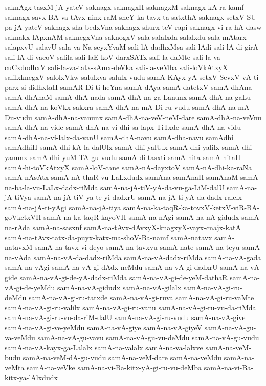 {saknAgx-tasxM-jA-yateV
saknagx
saknagxH
saknagxM
saknagx-kA-ra-kamf
saknagx-savx-BA-va-tAvx-ninx-raM-sheY-ka-tavx-ta-satxthA
saknagx-setxV-SU-pa-jA-yateV
saknagx-sha-bedxVna
saknagx-shurx-teV-rapi
saknagx-vi-ra-hA-dasw
saknakx-lApxnAM
saknegxVna
saknogxV
sala
salalxda
salalxdu
sala-mAtarx
salapxvU
salavU
sala-va-Na-seyxYvaM
sali-lA-dadhxMsa
sali-lAdi
sali-lA-di-girA
sali-lA-di-vacoV
salila
sali-laE-koV-darxSATx
sali-la-daMte
sali-la-va-cuCxdodhxV
sali-la-va-tatx-sAmx-deVka
sali-la-veMba
sali-loVkAtxyX
salilxknegxV
salolxVkw
salulxva
salulx-vudu
samA-KAyx-yA-setxV-SevxV-vA-ti-parx-si-didhxtaH
samAR-Di-ti-heYna
samA-dAya
samA-datetxV
samA-dhAna
samA-dhAnaM
samA-dhA-nada
samA-dhA-na-ga-Lanunx
samA-dhA-na-gaLu
samA-dhA-na-koVkx-sakxra
samA-dhA-na-mA-Di-ru-vudu
samA-dhA-na-mA-Du-vudu
samA-dhA-na-vanunx
samA-dhA-na-veV-neM-dare
samA-dhA-na-veVnu
samA-dhA-na-vide
samA-dhA-na-vi-dhi-sa-lapx-TiTxde
samA-dhA-na-vidu
samA-dhA-na-vi-lalx-da-vanU
samA-dhA-navu
samA-dha-navu
samAdhi
samAdhiH
samA-dhi-kA-la-dalUlx
samA-dhi-yalUlx
samA-dhi-yalilx
samA-dhi-yanunx
samA-dhi-yuM-TA-gu-vudu
samA-di-tasxti
samA-hita
samA-hitaH
samA-hi-toVkAtxyX
samA-loV-cane
samA-nA-dayxtoV
samA-nA-dhi-ka-raNa
samA-nAsAtx
samA-nA-thaR-vu-LaLxdudx
samAna
samAnaH
samAnaM
samA-na-ba-la-vu-LaLx-dadx-riMda
samA-na-jA-tiV-yA-da-vu-ga-LiM-dalU
samA-na-jA-tiVya
samA-na-jA-tiV-ya-te-yi-dadxrU
samA-na-jA-ti-yA-da-dadx-ralelx
samA-na-jA-ti-yAgi
samA-na-jA-tiya
samA-na-ka-taqR-ka-tovxV-ketxV-viR-BA-goVketxVH
samA-na-ka-taqR-kayoVH
samA-na-nAgi
samA-na-nA-gidudx
samA-na-rAda
samA-na-sasxnf
samA-na-tAvx-dAvxyX-knagxyX-vayx-cnajx-katA
samA-na-tAvx-tatx-da-puyx-katx-ma-shoV-Ba-namf
samA-natavx
samA-natavxM
samA-na-tavx-vi-deyo
samA-na-tavxvu
samA-nate
samA-na-teyu
samA-na-vAda
samA-na-vA-da-dadx-riMda
samA-na-vA-dadx-riMda
samA-na-vA-gada
samA-na-vAgi
samA-na-vA-gi-dAdx-neMdu
samA-na-vA-gi-dadxrU
samA-na-vA-gide
samA-na-vA-gi-de-yA-dadx-riMda
samA-na-vA-gi-de-yeM-dathaR
samA-na-vA-gi-de-yeMdu
samA-na-vA-gidudx
samA-na-vA-gilalx
samA-na-vA-gi-ru-deMdu
samA-na-vA-gi-ru-tatxde
samA-na-vA-gi-ruva
samA-na-vA-gi-ru-vaMte
samA-na-vA-gi-ru-valilx
samA-na-vA-gi-ru-vanu
samA-na-vA-gi-ru-vu-da-riMda
samA-na-vA-gi-ru-vu-da-riM-dalU
samA-na-vA-gi-ru-vudu
samA-na-vA-give
samA-na-vA-gi-ve-yeMdu
samA-na-vA-giye
samA-na-vA-giyeV
samA-na-vA-gu-va-veMdu
samA-na-vA-gu-vavu
samA-na-vA-gu-vu-deMdu
samA-na-vA-gu-vudu
samA-na-vA-kayx-ga-Lalalx
samA-na-valalx
samA-na-va-lalxve
samA-na-veM-budu
samA-na-veM-dA-gu-vudu
samA-na-veM-dare
samA-na-veMdu
samA-na-veMta
samA-na-veVke
samA-na-vi-Ba-kitx-yA-gi-ru-vu-deMba
samA-na-vi-Ba-kitx-ya-lAlxdudx
}

